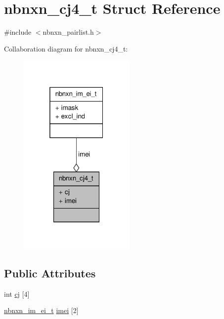 \hypertarget{structnbnxn__cj4__t}{\section{nbnxn\-\_\-cj4\-\_\-t \-Struct \-Reference}
\label{structnbnxn__cj4__t}
}


{\ttfamily \#include $<$nbnxn\-\_\-pairlist.\-h$>$}



\-Collaboration diagram for nbnxn\-\_\-cj4\-\_\-t\-:
\nopagebreak
\begin{figure}[H]
\begin{center}
\leavevmode
\includegraphics[width=160pt]{structnbnxn__cj4__t__coll__graph}
\end{center}
\end{figure}
\subsection*{\-Public \-Attributes}
\begin{DoxyCompactItemize}
\item 
int \hyperlink{structnbnxn__cj4__t_ad803e9faab3796ca7b432810e2906bf1}{cj} \mbox{[}4\mbox{]}
\item 
\hyperlink{structnbnxn__im__ei__t}{nbnxn\-\_\-im\-\_\-ei\-\_\-t} \hyperlink{structnbnxn__cj4__t_a28a64580ba8d660356993f01063563c3}{imei} \mbox{[}2\mbox{]}
\end{DoxyCompactItemize}


